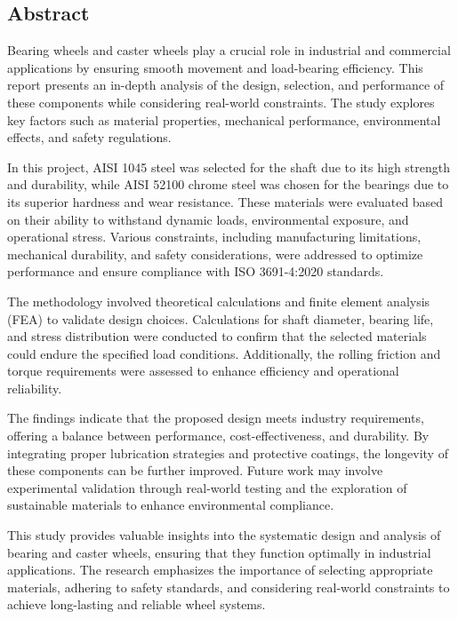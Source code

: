 \documentclass[../../main]{subfiles}
\begin{document}
\subsection{\texorpdfstring{\textbf{Abstract}}{Abstract}}\label{abstract}

Bearing wheels and caster wheels play a crucial role in industrial and
commercial applications by ensuring smooth movement and load-bearing
efficiency. This report presents an in-depth analysis of the design,
selection, and performance of these components while considering
real-world constraints. The study explores key factors such as material
properties, mechanical performance, environmental effects, and safety
regulations.

In this project, AISI 1045 steel was selected for the shaft due to its
high strength and durability, while AISI 52100 chrome steel was chosen
for the bearings due to its superior hardness and wear resistance. These
materials were evaluated based on their ability to withstand dynamic
loads, environmental exposure, and operational stress. Various
constraints, including manufacturing limitations, mechanical durability,
and safety considerations, were addressed to optimize performance and
ensure compliance with ISO 3691-4:2020 standards.

The methodology involved theoretical calculations and finite element
analysis (FEA) to validate design choices. Calculations for shaft
diameter, bearing life, and stress distribution were conducted to
confirm that the selected materials could endure the specified load
conditions. Additionally, the rolling friction and torque requirements
were assessed to enhance efficiency and operational reliability.

The findings indicate that the proposed design meets industry
requirements, offering a balance between performance,
cost-effectiveness, and durability. By integrating proper lubrication
strategies and protective coatings, the longevity of these components
can be further improved. Future work may involve experimental validation
through real-world testing and the exploration of sustainable materials
to enhance environmental compliance.

This study provides valuable insights into the systematic design and
analysis of bearing and caster wheels, ensuring that they function
optimally in industrial applications. The research emphasizes the
importance of selecting appropriate materials, adhering to safety
standards, and considering real-world constraints to achieve
long-lasting and reliable wheel systems.
\end{document}
